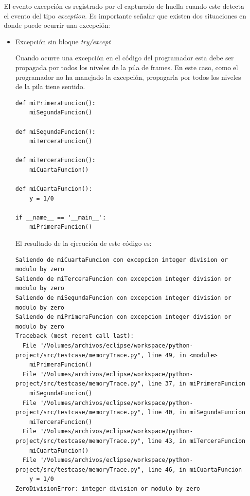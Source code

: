 \documentclass[12pt,legalpaper]{report}
\begin{document}
El evento excepción es registrado por el capturado de huella cuando este detecta el evento del tipo \textit{exception}.  Es importante señalar que existen dos situaciones en donde puede ocurrir una excepción:

\begin{itemize}
	\item Excepción sin bloque \textit{try/except}

Cuando ocurre una excepción en el código del programador esta debe ser propagada por todos los niveles de la pila de frames.  En este caso, como el programador no ha manejado la excepción, propagarla por todos los niveles de la pila tiene sentido.

\begin{singlespace}
\begin{lstlisting}[style=Python]
def miPrimeraFuncion():
    miSegundaFuncion()
    
def miSegundaFuncion():
    miTerceraFuncion()

def miTerceraFuncion():
    miCuartaFuncion()

def miCuartaFuncion():
    y = 1/0

if __name__ == '__main__':
    miPrimeraFuncion()
\end{lstlisting}
\end{singlespace}

El resultado de la ejecución de este código es:

\begin{singlespace}
\begin{lstlisting}[style=consola,numbers=none]
Saliendo de miCuartaFuncion con excepcion integer division or modulo by zero
Saliendo de miTerceraFuncion con excepcion integer division or modulo by zero
Saliendo de miSegundaFuncion con excepcion integer division or modulo by zero
Saliendo de miPrimeraFuncion con excepcion integer division or modulo by zero
Traceback (most recent call last):
  File "/Volumes/archivos/eclipse/workspace/python-project/src/testcase/memoryTrace.py", line 49, in <module>
    miPrimeraFuncion()
  File "/Volumes/archivos/eclipse/workspace/python-project/src/testcase/memoryTrace.py", line 37, in miPrimeraFuncion
    miSegundaFuncion()
  File "/Volumes/archivos/eclipse/workspace/python-project/src/testcase/memoryTrace.py", line 40, in miSegundaFuncion
    miTerceraFuncion()
  File "/Volumes/archivos/eclipse/workspace/python-project/src/testcase/memoryTrace.py", line 43, in miTerceraFuncion
    miCuartaFuncion()
  File "/Volumes/archivos/eclipse/workspace/python-project/src/testcase/memoryTrace.py", line 46, in miCuartaFuncion
    y = 1/0
ZeroDivisionError: integer division or modulo by zero
\end{lstlisting}
\end{singlespace}	



\end{itemize}
\end{document}
